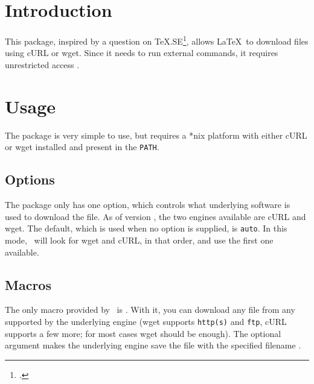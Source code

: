 \documentclass{skdoc}
\begin{document}

    \author{Simon Sigurdhsson}

    \maketitle
    \begin{abstract}
        The \thepackage\ package allows \LaTeX\ to download files using
        cURL or wget.
    \end{abstract}

    \section{Introduction}
    This package, inspired by a question on \TeX.SE\footcite{Klinger12},
    allows \LaTeX\ to download files using cURL or wget. Since it needs
    to run external commands, it requires unrestricted 
    access . 

    \section{Usage}
    The package is very simple to use, but requires a *nix platform with
    either cURL or wget installed and present in the \texttt{PATH}.

    \subsection{Options}
    The package only has one option, which controls what underlying
    software is used to download the file. As of version \theversion,
    the two engines available are cURL and wget. The default, which is
    used when no option is supplied, is \texttt{auto}. In this mode,
    \thepkg\ will look for wget and cURL, in that order, and use the
    first one available.

    \subsection{Macros}
    \DescribeMacro{}
    The only macro provided by \thepkg\ is . With it, you
    can download any file from any  supported by the underlying
    engine (wget supports \texttt{http(s)} and \texttt{ftp}, cURL
    supports a few more; for most cases wget should be enough). The
    optional argument  makes the underlying engine save
    the file with the specified filename .
\end{document}
